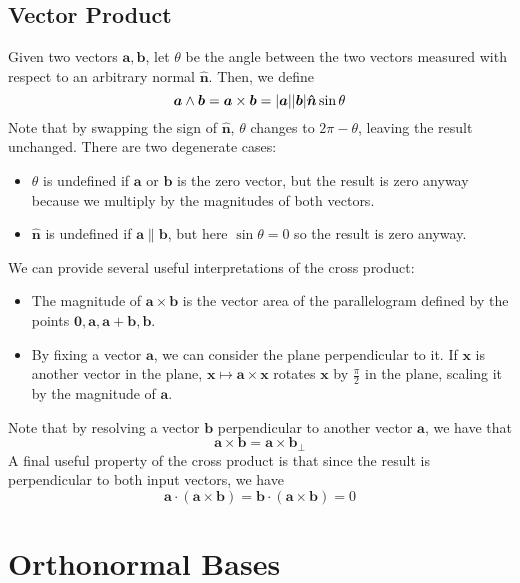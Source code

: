 \documentclass{article}
\begin{document}
\subsection{Vector Product}
\begin{definition}
	Given two vectors $\bm a, \bm b$, let $\theta$ be the angle between the two vectors measured with respect to an arbitrary normal $\bm{\hat n}$. Then, we define
	\[ \bm a \wedge \bm b = \bm a \times \bm b = \abs{\bm a} \abs{\bm b} \bm{\hat n} \sin \theta \]
	Note that by swapping the sign of $\bm{\hat n}$, $\theta$ changes to $2 \pi - \theta$, leaving the result unchanged. There are two degenerate cases:
	\begin{itemize}
		\item $\theta$ is undefined if $\bm a$ or $\bm b$ is the zero vector, but the result is zero anyway because we multiply by the magnitudes of both vectors.
		\item $\bm{\hat n}$ is undefined if $\bm a \parallel \bm b$, but here $\sin \theta = 0$ so the result is zero anyway.
	\end{itemize}
\end{definition}
We can provide several useful interpretations of the cross product:
\begin{itemize}
	\item The magnitude of $\bm a \times \bm b$ is the vector area of the parallelogram defined by the points $\bm 0, \bm a, \bm a + \bm b, \bm b$.
	\item By fixing a vector $\bm a$, we can consider the plane perpendicular to it. If $\bm x$ is another vector in the plane, $\bm x \mapsto \bm a \times \bm x$ rotates $\bm x$ by $\frac{\pi}{2}$ in the plane, scaling it by the magnitude of $\bm a$.
\end{itemize}
Note that by resolving a vector $\bm b$ perpendicular to another vector $\bm a$, we have that
\[ \bm a \times \bm b = \bm a \times \bm b_\perp \]
A final useful property of the cross product is that since the result is perpendicular to both input vectors, we have
\[ \bm a \cdot (\bm a \times \bm b) = \bm b \cdot(\bm a \times \bm b) = 0 \]

\section{Orthonormal Bases}
\end{document}

